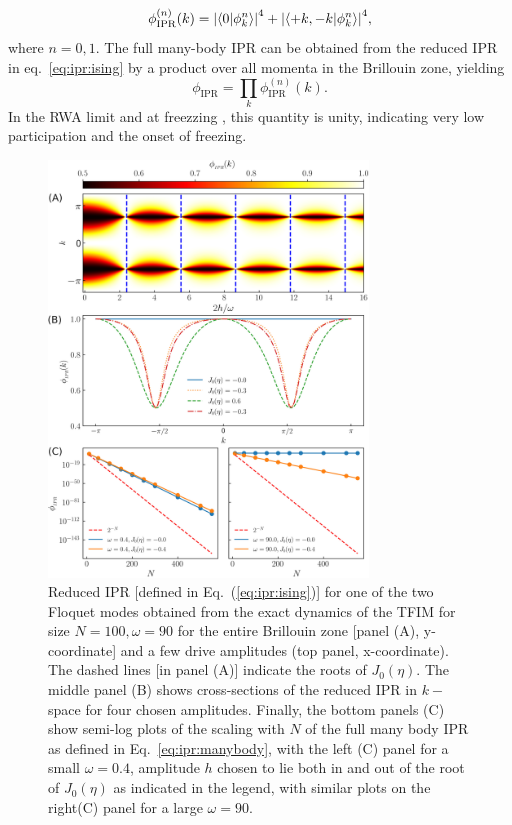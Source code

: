 \documentclass[%
reprint,
superscriptaddress,
amsmath,amssymb,
aps,
prb,
showkeys,
]{revtex4-2}
\begin{document}
\begin{equation}
	\label{eq:ipr:ising}
	\phi^{(n)}_\mathrm{IPR}(k) = \abs{\ip{0}{\phi^n_k}}^4 + \abs{\ip{ +k, -k }{\phi^n_k}}^4,
\end{equation}
where $n=0,1$. {The full many-body IPR can be obtained from the reduced IPR in eq.}~\ref{eq:ipr:ising} {by a product over all momenta in the Brillouin zone, yielding}
\begin{equation}
	\label{eq:ipr:manybody}
	\phi_\mathrm{IPR} = \prod_k \phi^{(n)}_\mathrm{IPR}(k).
\end{equation}
In the RWA limit and at freezzing , this quantity is unity, indicating very low participation and the onset of freezing.
\begin{figure}[t!]
	\centering
	\includegraphics[width = 8.5cm]{figure_2.jpeg}
	\caption{Reduced IPR [defined in Eq.~(\ref{eq:ipr:ising})] {for one of the two Floquet modes obtained from the exact dynamics of the TFIM for size} $N = 100, \omega=90$ {for the entire Brillouin zone [panel (A), y-coordinate] and a few drive amplitudes (top panel, x-coordinate). The dashed lines [in panel (A)] indicate the roots of} $J_0(\eta)${. The middle panel (B) shows cross-sections of the reduced IPR in} $k-$ {space for four chosen amplitudes. Finally, the bottom panels (C) show semi-log plots of the scaling with} $N$ {of the full many body IPR as defined in Eq.}~\ref{eq:ipr:manybody}, with the left (C) panel for a small $\omega=0.4$, amplitude $h$ chosen to lie both in and out of the root of $J_0(\eta)$ {as indicated in the legend, with similar plots on the right(C) panel for a large} $\omega=90$. }
	\label{fig:ipr:tfim}
\end{figure}
\end{document}
